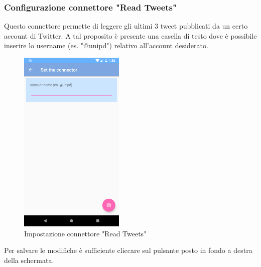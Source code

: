 \subsubsection{Configurazione connettore "Read Tweets"}
Questo connettore permette di leggere gli ultimi 3 tweet pubblicati da un certo account di Twitter. A tal proposito è presente una casella di testo dove è possibile inserire lo username (es. "@unipd") relativo all'account desiderato.
\begin{figure}[H]
	\centering
	\includegraphics[width=5cm]{../includes/pics/conf_read_tweet.png}
	\caption{\label{fig:conf_read_tweet}Impostazione connettore "Read Tweets"}
\end{figure}
Per salvare le modifiche è sufficiente cliccare sul pulsante posto in fondo a destra della schermata.

